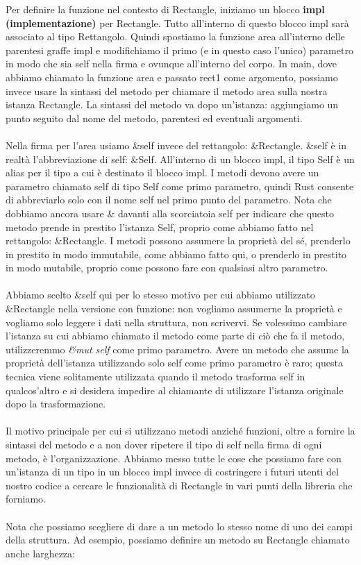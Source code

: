 \documentclass[11pt,a4paper]{article}
\begin{document}
Per definire la funzione nel contesto di Rectangle, iniziamo un blocco \textbf{impl (implementazione)} per Rectangle. Tutto all'interno di questo blocco impl sarà associato al tipo Rettangolo. Quindi spostiamo la funzione area all'interno delle parentesi graffe impl e modifichiamo il primo (e in questo caso l'unico) parametro in modo che sia self nella firma e ovunque all'interno del corpo. In main, dove abbiamo chiamato la funzione area e passato rect1 come argomento, possiamo invece usare la sintassi del metodo per chiamare il metodo area sulla nostra istanza Rectangle. La sintassi del metodo va dopo un'istanza: aggiungiamo un punto seguito dal nome del metodo, parentesi ed eventuali argomenti.\\
\\
Nella firma per l'area usiamo \&self invece del rettangolo: \&Rectangle. \&self è in realtà l'abbreviazione di self: \&Self. All'interno di un blocco impl, il tipo Self è un alias per il tipo a cui è destinato il blocco impl. I metodi devono avere un parametro chiamato self di tipo Self come primo parametro, quindi Rust consente di abbreviarlo solo con il nome self nel primo punto del parametro. Nota che dobbiamo ancora usare \& davanti alla scorciatoia self per indicare che questo metodo prende in prestito l'istanza Self, proprio come abbiamo fatto nel rettangolo: \&Rectangle. I metodi possono assumere la proprietà del sé, prenderlo in prestito in modo immutabile, come abbiamo fatto qui, o prenderlo in prestito in modo mutabile, proprio come possono fare con qualsiasi altro parametro.\\
\\
Abbiamo scelto \&self qui per lo stesso motivo per cui abbiamo utilizzato \&Rectangle nella versione con funzione: non vogliamo assumerne la proprietà e vogliamo solo leggere i dati nella struttura, non scrivervi. Se volessimo cambiare l'istanza su cui abbiamo chiamato il metodo come parte di ciò che fa il metodo, utilizzeremmo \textit{\&mut self} come primo parametro. Avere un metodo che assume la proprietà dell'istanza utilizzando solo self come primo parametro è raro; questa tecnica viene solitamente utilizzata quando il metodo trasforma self in qualcos'altro e si desidera impedire al chiamante di utilizzare l'istanza originale dopo la trasformazione.\\
\\
Il motivo principale per cui si utilizzano metodi anziché funzioni, oltre a fornire la sintassi del metodo e a non dover ripetere il tipo di self nella firma di ogni metodo, è l’organizzazione. Abbiamo messo tutte le cose che possiamo fare con un'istanza di un tipo in un blocco impl invece di costringere i futuri utenti del nostro codice a cercare le funzionalità di Rectangle in vari punti della libreria che forniamo.\\
\\
Nota che possiamo scegliere di dare a un metodo lo stesso nome di uno dei campi della struttura. Ad esempio, possiamo definire un metodo su Rectangle chiamato anche larghezza:
\end{document}

